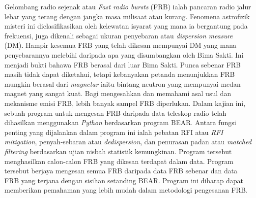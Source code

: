 Gelombang radio sejenak atau \textit{Fast radio bursts} (FRB) ialah pancaran radio jalur lebar yang terang dengan jangka masa milisaat atau kurang. Fenomena astrofizik misteri ini diclasifikasikan oleh kelewatan isyarat yang mana ia bergantung pada frekuensi, juga dikenali sebagai ukuran penyebaran atau \textit{dispersion measure} (DM). Hampir kesemua FRB yang telah dikesan mempunyai DM yang mana penyebarannya melebihi daripada apa yang disumbangkan oleh Bima Sakti. Ini menjadi bukti bahawa FRB berasal dari luar Bima Sakti. Punca sebenar FRB masih tidak dapat diketahui, tetapi kebanyakan petanda menunjukkan FRB mungkin berasal dari \textit{magnetar} iaitu bintang neutron yang mempunyai medan magnet yang sangat kuat. Bagi mengesahkan dan memahami asal usul dan mekanisme emisi FRB, lebih banyak sampel FRB diperlukan. Dalam kajian ini, sebuah program untuk mengesan FRB daripada data teleskop radio telah dihasilkan menggunakan \textit{Python} berdasarkan program BEAR. Antara fungsi penting yang dijalankan dalam program ini ialah pebatan RFI atau \textit{RFI mitigation}, penyah-sebaran atau \textit{dedispersion}, dan penurasan padan atau \textit{matched filtering} berdasarkan ujian nisbah statistik kemungkinan. Program tersebut menghasilkan calon-calon FRB yang dikesan terdapat dalam data. Program tersebut berjaya mengesan semua FRB daripada data FRB sebenar dan data FRB yang terjana dengan sisihan setanding BEAR. Program ini diharap dapat memberikan pemahaman yang lebih mudah dalam metodologi pengesanan FRB.